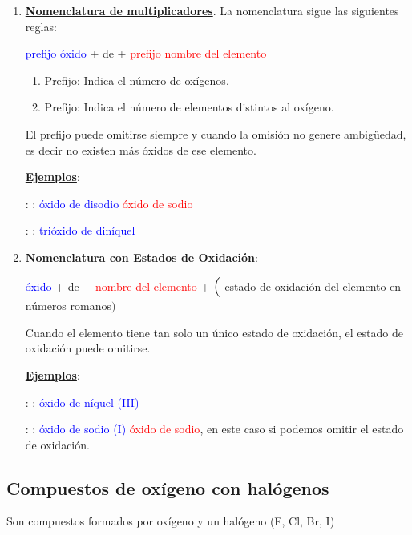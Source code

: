 \documentclass[11pt, a4paper]{article}
\begin{document}
\begin{enumerate}[label=\itembolascolor{\arabic*}{blue}]
    \item \textbf{\uline{Nomenclatura de multiplicadores}}. La nomenclatura sigue las siguientes reglas:
          \begin{center}
              \textcolor{blue}{prefijo} \textcolor{blue}{óxido} + de + \textcolor{red}{prefijo} \textcolor{red}{nombre del elemento}
          \end{center}

          \begin{enumerate}[label=\textcolor{red}{$\bullet$}]
              \item Prefijo: Indica el número de oxígenos.
              \item Prefijo: Indica el número de elementos distintos al oxígeno.
          \end{enumerate}

          El prefijo  puede omitirse siempre y cuando la omisión no genere ambigüedad, es decir no existen más óxidos de ese elemento.

          \textbf{\uline{Ejemplos}}:

           : : \textcolor{blue}{óxido de disodio} \ch{->} \textcolor{red}{óxido de sodio}

           : : \textcolor{blue}{trióxido de diníquel} 

    \item \textbf{\uline{Nomenclatura con Estados de Oxidación}}:
          \begin{center}
              \textcolor{blue}{óxido} + de + \textcolor{red}{nombre del elemento} + $\Bigl($ \textcolor{green!50!black}{estado de oxidación del elemento en números romanos}$\Bigr)$
          \end{center}
          Cuando el elemento tiene tan solo un único estado de oxidación, el estado de oxidación puede omitirse.

          \textbf{\uline{Ejemplos}}:

           : : \textcolor{blue}{óxido de níquel (III)}

           : : \textcolor{blue}{óxido de sodio (I)} \ch{->} \textcolor{red}{óxido de sodio}, en este caso si podemos omitir el estado de oxidación.
\end{enumerate}


\subsection{Compuestos de oxígeno con halógenos}
Son compuestos formados por oxígeno y un halógeno (F, Cl, Br, I)
\end{document}
